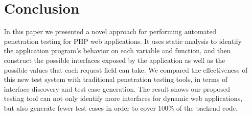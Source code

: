 \chapter{Conclusion}
In this paper we presented a novel approach for performing automated penetration testing for PHP web applications. It uses static analysis to identify the application program's behavior on each variable and function, and then construct the possible interfaces exposed by the application as well as the possible values that each request field can take. We compared the effectiveness of this new test system with traditional penetration testing tools, in terms of interface discovery and test case generation. The result shows our proposed testing tool can not only identify more interfaces for dynamic web applications, but also generate fewer test cases in order to cover 100\% of the backend code.